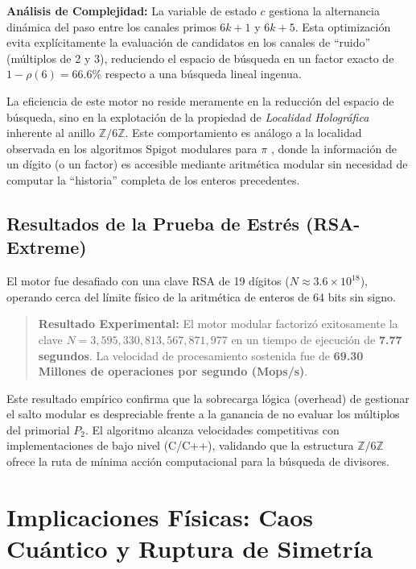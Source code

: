 \documentclass[12pt, a4paper]{article}
\theoremstyle{plain}
\theoremstyle{definition}
\newcommand{\Z}{\mathbb{Z}}
\begin{document}
\vspace{0.2cm}
\noindent \textbf{Análisis de Complejidad:} La variable de estado $c$ gestiona la alternancia dinámica del paso entre los canales primos $6k+1$ y $6k+5$. Esta optimización evita explícitamente la evaluación de candidatos en los canales de ``ruido'' (múltiplos de 2 y 3), reduciendo el espacio de búsqueda en un factor exacto de $1 - \rho(6) = 66.6\%$ respecto a una búsqueda lineal ingenua.

La eficiencia de este motor no reside meramente en la reducción del espacio de búsqueda, sino en la explotación de la propiedad de \emph{Localidad Holográfica} inherente al anillo $\Z/6\Z$. Este comportamiento es análogo a la localidad observada en los algoritmos Spigot modulares para $\pi$ \cite{peinador_pi_2025}, donde la información de un dígito (o un factor) es accesible mediante aritmética modular sin necesidad de computar la ``historia'' completa de los enteros precedentes.

\subsection{Resultados de la Prueba de Estrés (RSA-Extreme)}

El motor fue desafiado con una clave RSA de 19 dígitos ($N \approx 3.6 \times 10^{18}$), operando cerca del límite físico de la aritmética de enteros de 64 bits sin signo.

\begin{quote}
\textbf{Resultado Experimental:} El motor modular factorizó exitosamente la clave $N = 3,595,330,813,567,871,977$ en un tiempo de ejecución de \textbf{7.77 segundos}. La velocidad de procesamiento sostenida fue de \textbf{69.30 Millones de operaciones por segundo (Mops/s)}.
\end{quote}

Este resultado empírico confirma que la sobrecarga lógica (overhead) de gestionar el salto modular es despreciable frente a la ganancia de no evaluar los múltiplos del primorial $P_2$. El algoritmo alcanza velocidades competitivas con implementaciones de bajo nivel (C/C++), validando que la estructura $\Z/6\Z$ ofrece la ruta de mínima acción computacional para la búsqueda de divisores.

\section{Implicaciones Físicas: Caos Cuántico y Ruptura de Simetría}
\end{document}
